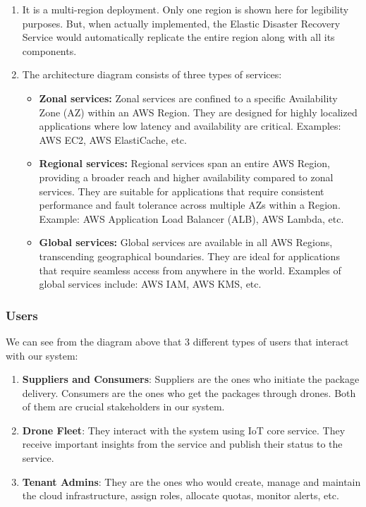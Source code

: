 \documentclass{article}
\begin{document}
\begin{enumerate}
    \item It is a multi-region deployment. Only one region is shown here for legibility purposes. But, when actually implemented, the Elastic Disaster Recovery Service would automatically replicate the entire region along with all its components.
    \item The architecture diagram consists of three types of services:
    \begin{itemize}
        \item \textbf{Zonal services:} Zonal services are confined to a specific Availability Zone (AZ) within an AWS Region. They are designed for highly localized applications where low latency and availability are critical. Examples: AWS EC2, AWS ElastiCache, etc.
        \item \textbf{Regional services:} Regional services span an entire AWS Region, providing a broader reach and higher availability compared to zonal services. They are suitable for applications that require consistent performance and fault tolerance across multiple AZs within a Region. Example: AWS Application Load Balancer (ALB), AWS Lambda, etc.
        \item \textbf{Global services:} Global services are available in all AWS Regions, transcending geographical boundaries. They are ideal for applications that require seamless access from anywhere in the world. Examples of global services include: AWS IAM, AWS KMS, etc.
    \end{itemize}
\end{enumerate}
\subsubsection{Users}
We can see from the diagram above that 3 different types of users that interact with our system:
\begin{enumerate}
    \item \textbf{Suppliers and Consumers}: Suppliers are the ones who initiate the package delivery. Consumers are the ones who get the packages through drones. Both of them are crucial stakeholders in our system. 
    \item \textbf{Drone Fleet}: They interact with the system using IoT core service. They receive important insights from the service and publish their status to the service. 
    \item \textbf{Tenant Admins}: They are the ones who would create, manage and maintain the cloud infrastructure, assign roles, allocate quotas, monitor alerts, etc.
\end{enumerate}
\end{document}
